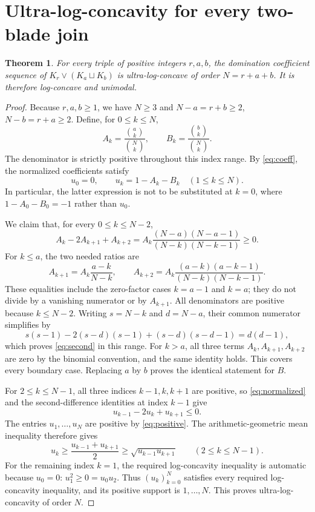 \documentclass[11pt,a4paper]{article}
\newtheorem{theorem}{Theorem}
\begin{document}
\section{Ultra-log-concavity for every two-blade join}
\begin{theorem}\label{thm:ulc}
For every triple of positive integers $r,a,b$, the domination
coefficient sequence of $K_r\vee(K_a\sqcup K_b)$ is ultra-log-concave
of order $N=r+a+b$. It is therefore log-concave and unimodal.
\end{theorem}
\begin{proof}
Because $r,a,b\ge1$, we have $N\ge3$ and
$N-a=r+b\ge2$, $N-b=r+a\ge2$. Define, for $0\le k\le N$,
\[
 A_k=\frac{\binom ak}{\binom Nk},\qquad
 B_k=\frac{\binom bk}{\binom Nk}.
\]
The denominator is strictly positive throughout this index range.
By \eqref{eq:coeff}, the normalized coefficients satisfy
\begin{equation}\label{eq:normalized}
 u_0=0,\qquad u_k=1-A_k-B_k\quad(1\le k\le N).
\end{equation}
In particular, the latter expression is not to be substituted at
$k=0$, where $1-A_0-B_0=-1$ rather than $u_0$.

We claim that, for every $0\le k\le N-2$,
\begin{equation}\label{eq:second}
 A_k-2A_{k+1}+A_{k+2}
 =A_k\frac{(N-a)(N-a-1)}{(N-k)(N-k-1)}\ge0.
\end{equation}
For $k\le a$, the two needed ratios are
\[
 A_{k+1}=A_k\frac{a-k}{N-k},\qquad
 A_{k+2}=A_k\frac{(a-k)(a-k-1)}{(N-k)(N-k-1)}.
\]
These equalities include the zero-factor cases $k=a-1$ and $k=a$;
they do not divide by a vanishing numerator or by $A_{k+1}$.
All denominators are positive because $k\le N-2$.
Writing $s=N-k$ and $d=N-a$, their common numerator simplifies by
\[
 s(s-1)-2(s-d)(s-1)+(s-d)(s-d-1)=d(d-1),
\]
which proves \eqref{eq:second} in this range. For $k>a$, all three
terms $A_k,A_{k+1},A_{k+2}$ are zero by the binomial convention,
and the same identity holds. This covers every boundary case.
Replacing $a$ by $b$ proves the identical statement for $B$.

For $2\le k\le N-1$, all three indices $k-1,k,k+1$ are positive,
so \eqref{eq:normalized} and the second-difference identities at
index $k-1$ give
\[
 u_{k-1}-2u_k+u_{k+1}\le0.
\]
The entries $u_1,\ldots,u_N$ are positive by \eqref{eq:positive}.
The arithmetic-geometric mean inequality therefore gives
\begin{equation}\label{eq:AGM}
 u_k\ge\frac{u_{k-1}+u_{k+1}}2
       \ge\sqrt{u_{k-1}u_{k+1}}
 \qquad(2\le k\le N-1).
\end{equation}
For the remaining index $k=1$, the required log-concavity inequality
is automatic because $u_0=0$:
$u_1^2\ge0=u_0u_2$. Thus $(u_k)_{k=0}^{N}$ satisfies every required
log-concavity inequality, and its positive support is $1,\ldots,N$.
This proves ultra-log-concavity of order $N$.


\end{proof}
\end{document}
